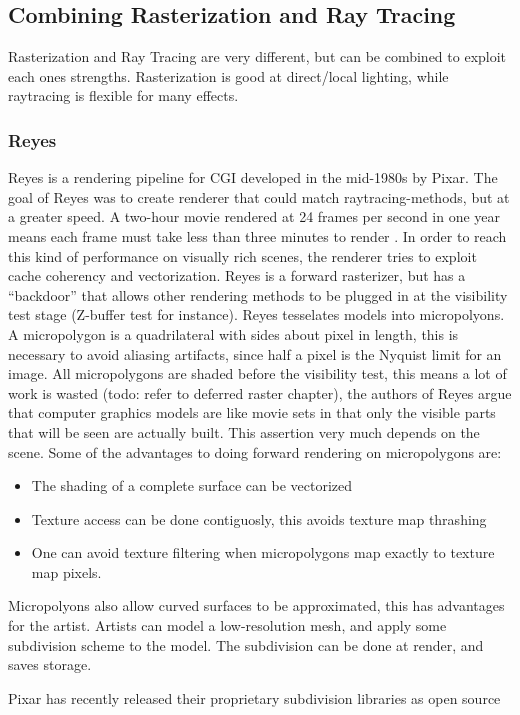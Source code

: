 \subsection {Combining Rasterization and Ray Tracing}
	Rasterization and Ray Tracing are very different, but can be combined to exploit each ones strengths. Rasterization is good at direct/local lighting, while raytracing is flexible for many effects.

\subsubsection {Reyes}
	\def\onequarter{\sfrac{1}{4}}
  \def\onehalf{\sfrac{1}{2}}
  
	Reyes is a rendering pipeline for CGI developed in the mid-1980s by Pixar. The goal of Reyes was to create renderer that could match raytracing-methods, but at a greater speed. A two-hour movie rendered at 24 frames per second in one year means each frame must take less than three minutes to render \cite{reyes1987}. In order to reach this kind of performance on visually rich scenes, the renderer tries to exploit cache coherency and vectorization. Reyes is a forward rasterizer, but has a ``backdoor'' that allows other rendering methods to be plugged in at the visibility test stage (Z-buffer test for instance). Reyes tesselates models into micropolyons. A micropolygon is a quadrilateral with sides about \onehalf pixel in length, this is necessary to avoid aliasing artifacts, since half a pixel is the Nyquist limit for an image. All micropolygons are shaded before the visibility test, this means a lot of work is wasted (todo: refer to deferred raster chapter), the authors of Reyes argue that computer graphics models are like movie sets in that only the visible parts that will be seen are actually built. This assertion very much depends on the scene. Some of the advantages to doing forward rendering on micropolygons are:
	
\begin{itemize}
	\item The shading of a complete surface can be vectorized
	\item Texture access can be done contiguosly, this avoids texture map thrashing
	\item One can avoid texture filtering when micropolygons map exactly to texture map pixels.
\end{itemize}
	
	Micropolyons also allow curved surfaces to be approximated, this has advantages for the artist. Artists can model a low-resolution mesh, and apply some subdivision scheme to the model. The subdivision can be done at render, and saves storage.
	
	Pixar has recently released their proprietary subdivision libraries as open source \cite{pixar_subdiv}
	
	
